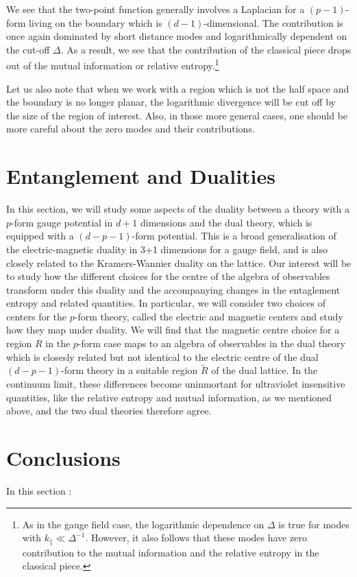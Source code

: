 \par We see that the two-point function generally involves a Laplacian for
a $(p-1)$-form living on the boundary which is $(d-1)$-dimensional. The
contribution is once again dominated by short distance modes and
logarithmically dependent on the cut-off $\Delta$. As a result, we see that the
contribution of the classical piece drops out of the mutual information or
relative entropy.\footnote{As in the gauge field case, the logarithmic
  dependence on $\Delta$ is true for modes with $k_{\|}\ll\Delta^{-1}$.
  However, it also follows that these modes have zero contribution to the
mutual information and the relative entropy in the classical piece.}
\par Let us also note that when we work with a region which is not the half
space and the boundary is no longer planar, the logarithmic divergence will be
cut off by the size of the region of interest. Also, in those more general
cases, one should be more careful about the zero modes and their contributions.
\section{Entanglement and Dualities}
In this section, we will study some aspects of the duality between a theory
with a $p$-form gauge potential in $d+1$ dimensions and the dual theory, which
is equipped with a $(d-p-1)$-form potential. This is a broad generalisation of
the electric-magnetic duality in 3+1 dimensions for a gauge field, and is also
closely related to the Kramers-Wannier duality on the lattice. Our interest
will be to study how the different choices for the centre of the algebra of
observables transform under this duality and the accompanying changes in the
entaglement entropy and related quantities. In particular, we will consider two
choices of centers for the $p$-form theory, called the electric and magnetic 
centers and study how they map under duality. We will find that the magnetic 
centre choice for a region $R$ in the $p$-form case maps to an algebra 
of observables in the dual theory which is closesly related but not identical
to the  electric centre of the  dual $(d-p-1)$-form theory in a suitable region
$\tilde{R}$ of the dual lattice. In the continuum limit, these differences
become uninmortant for ultraviolet insensitive quantities, like the relative
entropy and mutual information,  as we mentioned above, and the two dual
theories therefore agree.

\section{Conclusions}
In this section :
